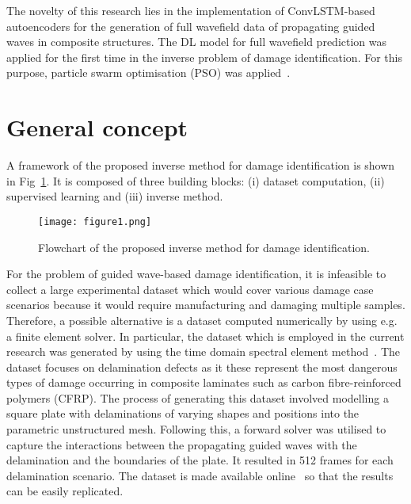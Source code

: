 \documentclass[sn-mathphys-num]{sn-jnl}%
\begin{document}
	The novelty of this research lies in the implementation of ConvLSTM-based 
	autoencoders for the generation of full wavefield data of propagating 
	guided waves in composite structures.
	The DL model for full wavefield prediction was applied for the first time 
	in the inverse problem of damage identification.
	For this purpose, particle swarm optimisation (PSO) was 
	applied~\cite{Keneddy1995}.
	\section{General concept}\label{sec2}
	A framework of the proposed inverse method for damage identification is 
	shown in Fig~\ref{fig:complete_flowchart}.
	It is composed of three building blocks: (i) dataset computation, (ii) 
	supervised learning and (iii) inverse method.
	
	\begin{figure} [h!]
		\begin{center}
			\texttt{[image: figure1.png]}
		\end{center}
		\caption{Flowchart of the proposed inverse method for damage 
		identification.} 
		\label{fig:complete_flowchart}
	\end{figure}
	
	For the problem of guided wave-based damage identification, it is 
	infeasible to collect a large experimental dataset which would cover 
	various damage case scenarios because it would require manufacturing and 
	damaging multiple samples.
	Therefore, a possible alternative is a dataset computed numerically by 
	using e.g. a finite element solver.
	In particular, the dataset which is employed in the current research was 
	generated by using the time domain spectral element 
	method~\cite{Kudela2020}.
	The dataset focuses on delamination defects as it these represent the most 
	dangerous types of damage occurring in composite laminates such as carbon 
	fibre-reinforced polymers (CFRP).
	The process of generating this dataset involved modelling a square plate 
	with delaminations of varying shapes and positions into the parametric 
	unstructured mesh. 
	Following this, a forward solver was utilised to capture the interactions 
	between the propagating guided waves with the delamination and the 
	boundaries of the plate.
	It resulted in 512 frames for each delamination scenario.
	The dataset is made available online~\cite{kudela_pawel_2021_5414555} so 
	that the results can be easily replicated.
	
\end{document}
